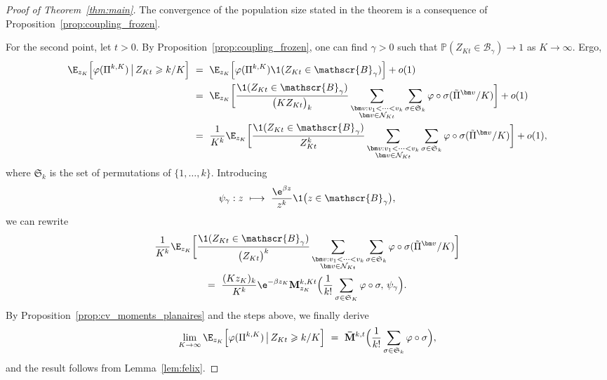 \begin{refsegment}
\begin{proof}[Proof of Theorem~\ref{thm:main}]
The convergence of the population size stated in the theorem 
is a consequence of Proposition~\ref{prop:coupling_frozen}.

For the second point, let $t > 0$. By Proposition~\ref{prop:coupling_frozen}, one can find $\gamma>0$ such that $\mathbb{P}(Z_{Kt} \in \mathscr{B}_\gamma) \to 1$ as $K \to \infty$. Ergo,
\begin{align*}
    \E_{z_K}\Big[\varphi(\Pi^{k,K}) \, \big\vert\,Z_{Kt}\geqslant k/K\Big] \ 
    &= \ \E_{z_K}\Big[\varphi(\Pi^{k,K}) \1(Z_{Kt} \in 
    \mathscr{B}_\gamma)\Big] + o(1) \\
    &= \ \E_{z_K}\bigg[ 
        \frac{\1(Z_{Kt} \in \mathscr{B}_\gamma)}{\big(KZ_{Kt}\big)_{k}} 
        \sum_{\substack{\bm v : v_1<\cdots<v_{k} \\ \bm v \in{\cal N}_{Kt}}} 
        \sum_{\sigma\in\mathfrak{S}_k} \varphi\circ\sigma(\tilde\Pi^{{\bm v}}/K)
    \bigg] + o(1) \\
    &= \ \frac{1}{K^k} \E_{z_K}\bigg[ 
        \frac{\1(Z_{Kt} \in \mathscr{B}_\gamma)}{Z_{Kt}^k} 
        \sum_{\substack{\bm v : v_1<\cdots<v_{k} \\ \bm v \in{\cal N}_{Kt}}} 
        \sum_{\sigma\in\mathfrak{S}_k} \varphi\circ\sigma(\tilde\Pi^{{\bm v}}/K)
    \bigg] + o(1),
\end{align*}
where $\mathfrak{S}_k$ is the set of permutations of $\{1,\ldots, k\}$. Introducing 
\[ 
    \psi_{\gamma}:z\ \longmapsto\ \frac{\e^{\beta z}}{z^k} \1\big(z\in
    \mathscr{B}_{\gamma}\big),
\]
we can rewrite
\begin{multline*}
    \frac{1}{K^k} \E_{z_K}\bigg[ 
        \frac{\1(Z_{Kt} \in \mathscr{B}_\gamma)}{\big(Z_{Kt}\big)^k} 
        \sum_{\substack{\bm v : v_1<\cdots<v_{k} \\ \bm v \in{\cal N}_{Kt}}} 
        \sum_{\sigma\in\mathfrak{S}_k} \varphi \circ \sigma(\tilde\Pi^{{\bm v}}/K)
    \bigg] \\
     =\ \frac{(Kz_K)_k}{K^k} \e^{-\beta z_K}
    \mathbf{M}^{k,Kt}_{z_K}\Big( \frac{1}{k!} \sum_{\sigma \in
    \mathfrak{S}_K} \varphi \circ \sigma,\, \psi_\gamma \Big).
\end{multline*}
By Proposition~\ref{prop:cv_moments_planaires} and the steps above, we finally derive
\[
    \lim_{K \to \infty} 
    \E_{z_K}\Big[\varphi(\Pi^{k,K}) \, \big\vert\,Z_{Kt}\geqslant k/K\Big]
   \ =\ \mathbf{\bar{M}}^{k,t}\Big( \frac{1}{k!} \sum_{\sigma \in
    \mathfrak{S}_k} \varphi \circ \sigma \Big),
\]
and the result follows from Lemma~\ref{lem:felix}.
\end{proof}

\begin{singlespace}
\setlength{}
\small\printbibliography[  segment=\therefsegment, heading=subbibliography, title=References for Chapter~\ref{chp3_singletype}]
\end{singlespace}
\end{refsegment}
